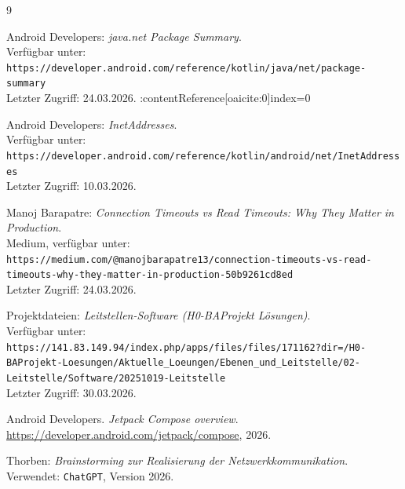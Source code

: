 \documentclass{article}
\begin{document}
\begingroup
\renewcommand{\section}[2]{}


\begin{thebibliography}{9}

Android Developers: \textit{java.net Package Summary}.\\
Verfügbar unter: \texttt{https://developer.android.com/reference/kotlin/java/net/package-summary}\\
Letzter Zugriff: 24.03.2026. :contentReference[oaicite:0]{index=0}

Android Developers: \textit{InetAddresses}.\\
Verfügbar unter: \texttt{https://developer.android.com/reference/kotlin/android/net/InetAddresses}\\
Letzter Zugriff: 10.03.2026.

Manoj Barapatre: \textit{Connection Timeouts vs Read Timeouts: Why They Matter in Production}.\\
Medium, verfügbar unter: \texttt{https://medium.com/@manojbarapatre13/connection-timeouts-vs-read-timeouts-why-they-matter-in-production-50b9261cd8ed}\\
Letzter Zugriff: 24.03.2026.

Projektdateien: \textit{Leitstellen-Software (H0-BAProjekt Lösungen)}.\\
Verfügbar unter: \texttt{https://141.83.149.94/index.php/apps/files/files/171162?dir=/H0-BAProjekt-Loesungen/Aktuelle\_Loeungen/Ebenen\_und\_Leitstelle/02-Leitstelle/Software/20251019-Leitstelle}\\
Letzter Zugriff: 30.03.2026.

Android Developers.
\emph{Jetpack Compose overview}.
\url{https://developer.android.com/jetpack/compose}, 2026.

Thorben: \textit{Brainstorming zur Realisierung der Netzwerkkommunikation}.\\
Verwendet: \texttt{ChatGPT}, Version 2026.

\end{thebibliography}
\end{document}
